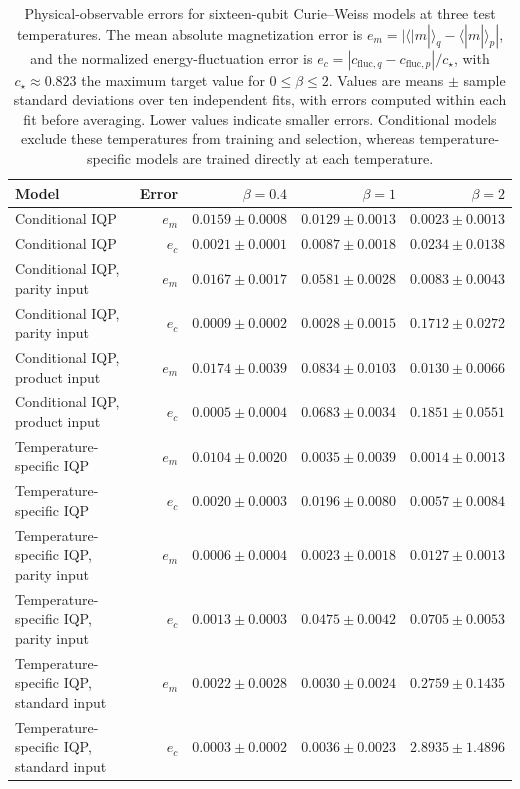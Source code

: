 \begin{table}[t]
\centering
\small
\caption{Physical-observable errors for sixteen-qubit Curie--Weiss models at three test temperatures. The mean absolute magnetization error is $e_m=|\langle|m|\rangle_q-\langle|m|\rangle_p|$, and the normalized energy-fluctuation error is $e_c=|c_{\mathrm{fluc},q}-c_{\mathrm{fluc},p}|/c_\star$, with $c_\star\approx0.823$ the maximum target value for $0\leq\beta\leq2$. Values are means $\pm$ sample standard deviations over ten independent fits, with errors computed within each fit before averaging. Lower values indicate smaller errors. Conditional models exclude these temperatures from training and selection, whereas temperature-specific models are trained directly at each temperature.}
\label{tab:cw_physics_errors}
\begin{tabular}{lrrrr}
\toprule
Model & Error & $\beta=0.4$ & $\beta=1$ & $\beta=2$ \\
\midrule
Conditional IQP & $e_m$ & $0.0159\pm0.0008$ & $0.0129\pm0.0013$ & $0.0023\pm0.0013$ \\
Conditional IQP & $e_c$ & $0.0021\pm0.0001$ & $0.0087\pm0.0018$ & $0.0234\pm0.0138$ \\
Conditional IQP, parity input & $e_m$ & $0.0167\pm0.0017$ & $0.0581\pm0.0028$ & $0.0083\pm0.0043$ \\
Conditional IQP, parity input & $e_c$ & $0.0009\pm0.0002$ & $0.0028\pm0.0015$ & $0.1712\pm0.0272$ \\
Conditional IQP, product input & $e_m$ & $0.0174\pm0.0039$ & $0.0834\pm0.0103$ & $0.0130\pm0.0066$ \\
Conditional IQP, product input & $e_c$ & $0.0005\pm0.0004$ & $0.0683\pm0.0034$ & $0.1851\pm0.0551$ \\
Temperature-specific IQP & $e_m$ & $0.0104\pm0.0020$ & $0.0035\pm0.0039$ & $0.0014\pm0.0013$ \\
Temperature-specific IQP & $e_c$ & $0.0020\pm0.0003$ & $0.0196\pm0.0080$ & $0.0057\pm0.0084$ \\
Temperature-specific IQP, parity input & $e_m$ & $0.0006\pm0.0004$ & $0.0023\pm0.0018$ & $0.0127\pm0.0013$ \\
Temperature-specific IQP, parity input & $e_c$ & $0.0013\pm0.0003$ & $0.0475\pm0.0042$ & $0.0705\pm0.0053$ \\
Temperature-specific IQP, standard input & $e_m$ & $0.0022\pm0.0028$ & $0.0030\pm0.0024$ & $0.2759\pm0.1435$ \\
Temperature-specific IQP, standard input & $e_c$ & $0.0003\pm0.0002$ & $0.0036\pm0.0023$ & $2.8935\pm1.4896$ \\
\bottomrule
\end{tabular}
\end{table}
